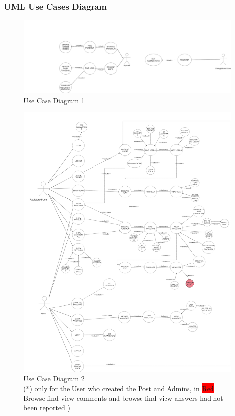 \subsubsection{UML Use Cases Diagram}
\begin{figure}[H]
	\centering
	\includegraphics[width=\textwidth]{img/uml_use_case_2.png}
	\caption{Use Case Diagram 1}
\end{figure}
\begin{figure}[H]
	\centering
	\includegraphics[width=\textwidth]{img/uml_use_case_1.png}
	\caption{Use Case Diagram 2\\ (*) only for the User who created the Post and Admins, in  \colorbox{Red}{Red} Browse-find-view comments and browse-find-view answers had not been reported )}
	
\end{figure}


